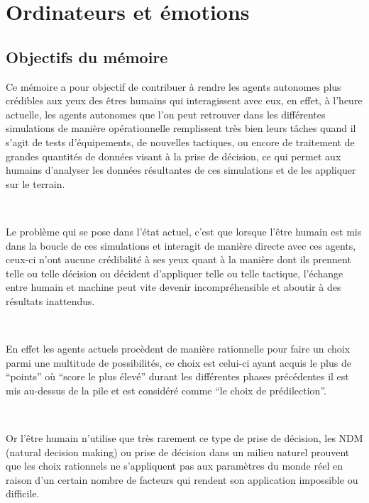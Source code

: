 
\chapter{Ordinateurs et émotions} %

\label{Chapter2} %


\section{Objectifs du mémoire}

Ce mémoire a pour objectif de contribuer à rendre les agents autonomes plus crédibles aux yeux des êtres humains qui interagissent avec eux, en effet, à l’heure actuelle, les agents autonomes que l’on peut retrouver dans les différentes simulations de manière opérationnelle remplissent très bien leurs tâches quand il s’agit de tests d’équipements, de nouvelles tactiques, ou encore de traitement de grandes quantités de données visant à la prise de décision,  ce qui permet aux humains d’analyser les données résultantes de ces simulations et de les appliquer sur le terrain.

~\par
Le problème qui se pose dans l’état actuel, c’est que lorsque l'être humain est mis dans la boucle de ces simulations et interagit de manière directe avec ces agents, ceux-ci n’ont aucune crédibilité à ses yeux quant à la manière dont ils prennent telle ou telle décision ou décident d’appliquer telle ou telle tactique, l’échange entre humain et machine peut vite devenir incompréhensible et aboutir à des résultats inattendus.

~\par
En effet les agents actuels procèdent de manière rationnelle pour faire un choix parmi une multitude de possibilités, ce choix est celui-ci ayant acquis le plus de “points” où “score le plus élevé” durant les différentes phases précédentes il est mis au-dessus de la pile et est considéré comme “le choix de prédilection”. 

~\par
Or l'être humain n’utilise que très rarement ce type de prise de décision, les NDM (natural decision making) ou prise de décision dans un milieu naturel prouvent que les choix rationnels ne s'appliquent pas aux paramètres du monde réel en raison d'un certain nombre de facteurs qui rendent son application impossible ou difficile. 

